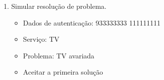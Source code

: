 \documentclass[11pt, a4paper]{article}
\begin{document}
\begin{appendices}
\begin{enumerate}
\begin{figure}[H]
        \qquad
    \end{figure}
    \item Simular resolução de problema.
    \begin{itemize}
        \item Dados de autenticação: 933333333 111111111
        \item Serviço: TV
        \item Problema: TV avariada
        \item Aceitar a primeira solução
    \end{itemize}
    \begin{figure}[H]
        \centering
        \qquad
    \end{figure}
\end{enumerate}

\end{appendices}
\end{document}
